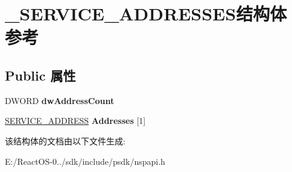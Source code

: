 \hypertarget{struct___s_e_r_v_i_c_e___a_d_d_r_e_s_s_e_s}{}\section{\+\_\+\+S\+E\+R\+V\+I\+C\+E\+\_\+\+A\+D\+D\+R\+E\+S\+S\+E\+S结构体 参考}
\label{struct___s_e_r_v_i_c_e___a_d_d_r_e_s_s_e_s}
\subsection*{Public 属性}
\begin{DoxyCompactItemize}
\item 
\mbox{\label{struct___s_e_r_v_i_c_e___a_d_d_r_e_s_s_e_s_a4d25376f24c0a44b00950961193e85be}} 
D\+W\+O\+RD {\bfseries dw\+Address\+Count}
\item 
\mbox{\label{struct___s_e_r_v_i_c_e___a_d_d_r_e_s_s_e_s_adf591afb8b951acf4a6394234b1c8c10}} 
\hyperlink{struct___s_e_r_v_i_c_e___a_d_d_r_e_s_s}{S\+E\+R\+V\+I\+C\+E\+\_\+\+A\+D\+D\+R\+E\+SS} {\bfseries Addresses} \mbox{[}1\mbox{]}
\end{DoxyCompactItemize}


该结构体的文档由以下文件生成\+:\begin{DoxyCompactItemize}
\item 
E\+:/\+React\+O\+S-\/0../sdk/include/psdk/nspapi.\+h\end{DoxyCompactItemize}

